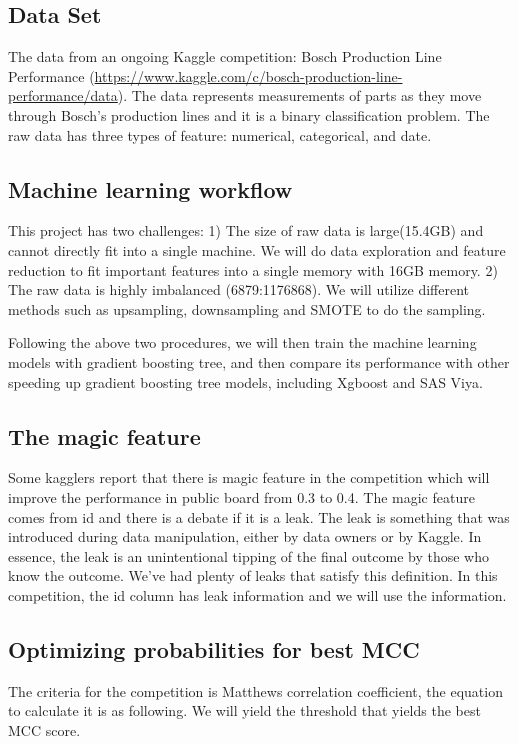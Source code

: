 \documentclass{article}
\begin{document}
\subsection{Data Set}

The data from an ongoing Kaggle competition: Bosch Production Line Performance (\url{https://www.kaggle.com/c/bosch-production-line-performance/data}). The data represents measurements of parts as they move through Bosch's production lines and it is a binary classification problem. The raw data has three types of feature: numerical, categorical, and date.

\subsection{Machine learning workflow}

This project has two challenges: 1) The size of raw data is large(15.4GB) and cannot directly fit into a single machine. We will do data exploration and feature reduction to fit important features into a single memory with 16GB memory. 2) The raw data is highly imbalanced (6879:1176868). We will utilize different methods such as upsampling, downsampling and SMOTE to do the sampling.

Following the above two procedures, we will then train the machine learning models with gradient boosting tree, and then compare its performance with other speeding up gradient boosting tree models, including Xgboost and SAS Viya.

\subsection{The magic feature}
Some kagglers report that there is magic feature in the competition which will improve the performance in public board from 0.3 to 0.4. The magic feature comes from id and there is a debate if it is a leak. The leak is something that was introduced during data manipulation, either by data owners or by Kaggle. In essence, the leak is an unintentional tipping of the final outcome by those who know the outcome. We've had plenty of leaks that satisfy this definition.  In this competition, the id column has leak information and we will use the information.

\subsection{Optimizing probabilities for best MCC}
The criteria for the competition is Matthews correlation coefficient, the equation to calculate it is as following. We will yield the threshold that yields the best MCC score.
\end{document}
